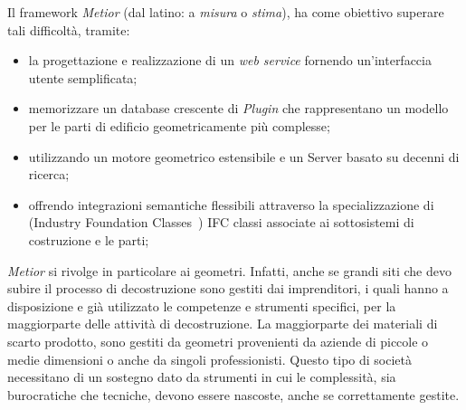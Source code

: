 

Il framework \emph{Metior} (dal latino: a \emph{misura} o \emph{stima}),
ha come obiettivo superare tali difficoltà, tramite:
\begin{itemize}
  \item la progettazione e realizzazione di un \emph{web service} fornendo un'interfaccia utente semplificata;
  \item memorizzare un database crescente di \emph{Plugin} che rappresentano un modello per le parti di edificio geometricamente più complesse;
  \item utilizzando un motore geometrico estensibile e un Server basato su decenni di ricerca;
  \item offrendo integrazioni semantiche flessibili attraverso la specializzazione di (Industry Foundation Classes~\cite{ifc})
        IFC classi associate ai sottosistemi di costruzione e le parti;
\end{itemize}



\emph{Metior} si rivolge in particolare ai geometri. Infatti, anche se grandi siti che devo subire il processo di decostruzione
sono gestiti dai imprenditori, i quali hanno a disposizione e già utilizzato le competenze e strumenti specifici,
per la maggiorparte delle attività di decostruzione. La maggiorparte dei materiali di scarto prodotto,
sono gestiti da geometri provenienti da aziende di piccole o medie dimensioni o anche da singoli professionisti.
Questo tipo di società necessitano di un sostegno dato da strumenti in cui le complessità,
sia burocratiche che tecniche, devono essere nascoste, anche se correttamente gestite.

